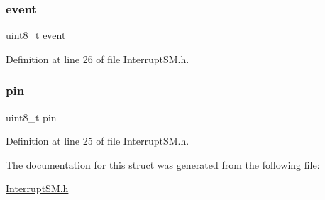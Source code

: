 \mbox{\label{struct_i_s_r___typ_aeef6900f411bc223febdd92c9435693b}} 
\subsubsection{\texorpdfstring{event}{event}}
{\footnotesize\ttfamily uint8\+\_\+t \mbox{\hyperlink{_interrupt_s_m_8h_a3b65133bb9997cd1ccf311af0927fc9e}{event}}}



Definition at line 26 of file Interrupt\+S\+M.\+h.

\mbox{\label{struct_i_s_r___typ_ab40a673fb19c1e650e1f79de91788aa5}} 
\subsubsection{\texorpdfstring{pin}{pin}}
{\footnotesize\ttfamily uint8\+\_\+t pin}



Definition at line 25 of file Interrupt\+S\+M.\+h.



The documentation for this struct was generated from the following file\+:\begin{DoxyCompactItemize}
\item 
\mbox{\hyperlink{_interrupt_s_m_8h}{Interrupt\+S\+M.\+h}}\end{DoxyCompactItemize}
